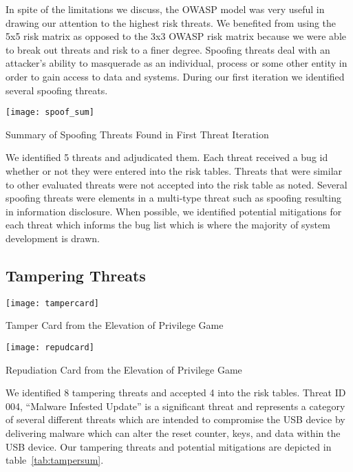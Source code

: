 In spite of the limitations we discuss, the OWASP model was very useful in drawing our attention to the highest risk threats.  We benefited from using the 5x5 risk matrix as opposed to the 3x3 OWASP risk matrix because we were able to break out threats and risk to a finer degree. Spoofing threats deal with an attacker's ability to masquerade as an individual, process or some other entity in order to gain access to data and systems.  During our first iteration we identified several spoofing threats.

\begin{table*}[ht]
    \centering
    \texttt{[image: spoof\_sum]}
    \caption{Summary of Spoofing Threats Found in First Threat Iteration}
    \label{tab:spoofsum}
\end{table*}
We identified 5 threats and adjudicated them. Each threat received a bug id whether or not they were entered into the risk tables.  Threats that were similar to other evaluated threats were not accepted into the risk table as noted. Several spoofing threats were elements in a multi-type threat such as spoofing resulting in information disclosure. When possible, we identified potential mitigations for each threat which informs the bug list which is where the majority of system development is drawn.

\subsection{Tampering Threats}

\begin{marginfigure}%
\centering
  \texttt{[image: tampercard]}
  \caption{Tamper Card from the Elevation of Privilege Game}
  \label{fig:tampercardcard}
\end{marginfigure}

\begin{marginfigure}%
\centering
  \texttt{[image: repudcard]}
  \caption{Repudiation Card from the Elevation of Privilege Game}
  \label{fig:repudcard}
\end{marginfigure}

We identified 8 tampering threats and accepted 4 into the risk tables.  Threat ID 004, ``Malware Infested Update'' is a significant threat and represents a category of several different threats which are intended to compromise the USB device by delivering malware which can alter the reset counter, keys, and data within the USB device.  Our tampering threats and potential mitigations are depicted in table~\ref{tab:tampersum}.

